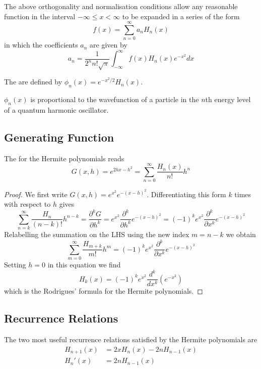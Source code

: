 \documentclass[12pt, a4paper, oneside, openright, titlepage]{book}
\begin{document}
The above orthogonality and normalisation conditions allow any reasonable function in the interval $-\infty \leq x < \infty$ to be expanded in a series of the form \begin{equation*}
    f(x) = \sum_{n=0}^{\infty}a_nH_n(x)
\end{equation*}
in which the coefficients $a_n$ are given by \begin{equation*}
    a_n = \frac{1}{2^nn!\sqrt{\pi}}\int_{-\infty}^{\infty}f(x)H_n(x)e^{-x^2}dx
\end{equation*}

\begin{defn}
    The  are defined by $\phi_n(x) = e^{-x^2/2}H_n(x)$.
\end{defn}

$\phi_n(x)$ is proportional to the wavefunction of a particle in the $n$th energy level of a quantum harmonic oscillator.

\subsection{Generating Function}

\begin{defn}
    The  for the Hermite polynomials reads \begin{equation*}
        G(x,h) = e^{2hx - h^2} = \sum_{n=0}^{\infty}\frac{H_n(x)}{n!}h^n
    \end{equation*}
\end{defn}
\begin{proof}
    We first write $G(x,h) = e^{x^2}e^{-(x-h)^2}$. Differentiating this form $k$ times with respect to $h$ gives \begin{equation*}
        \sum_{n=k}^{\infty}\frac{H_n}{(n-k)!}h^{n-k} = \frac{\partial^kG}{\partial h^k} = e^{x^2}\frac{\partial^k}{\partial h^k}e^{-(x-h)^2} = (-1)^ke^{x^2}\frac{\partial^k}{\partial x^k}e^{-(x-h)^2}
    \end{equation*}
    Relabelling the summation on the LHS using the new index $m = n-k$ we obtain \begin{equation*}
        \sum_{m=0}^{\infty}\frac{H_{m+k}}{m!}h^m = (-1)^ke^{x^2}\frac{\partial^k}{\partial x^k}e^{-(x-h)^2}
    \end{equation*}
    Setting $h = 0$ in this equation we find \begin{equation*}
        H_k(x) = (-1)^ke^{x^2}\frac{d^k}{dx^k}(e^{-x^2})
    \end{equation*}
    which is the Rodrigues' formula for the Hermite polynomials.
\end{proof}

\subsection{Recurrence Relations}

The two most useful recurrence relations satisfied by the Hermite polynomials are \begin{align}
    H_{n+1}(x) &= 2xH_n(x) - 2nH_{n-1}(x) \\
    H_n'(x) &= 2nH_{n-1}(x)
\end{align}







\begin{appendices}


\end{appendices}
\end{document}
